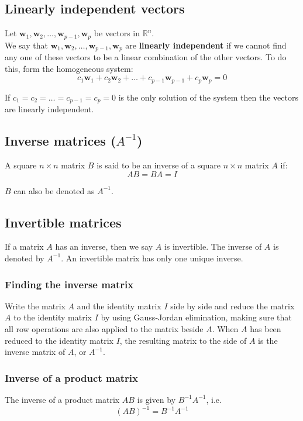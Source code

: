 \documentclass[11pt]{article}
\begin{document}
\subsection{Linearly independent vectors}
\label{sec:org09f90ef}
Let \(\boldsymbol{w}_1, \boldsymbol{w}_2, \ldots, \boldsymbol{w}_{p-1}, \boldsymbol{w}_p\) be vectors in \(\mathbb{R}^n\).
\\[0pt]

We say that \(\boldsymbol{w}_1, \boldsymbol{w}_2, \ldots, \boldsymbol{w}_{p-1}, \boldsymbol{w}_p\) are \textbf{linearly independent} if we cannot find any one of these vectors to be a linear combination of the other vectors. To do this, form the homogeneous system:
\[c_1 \boldsymbol{w}_1 + c_2 \boldsymbol{w}_2 + \ldots + c_{p-1} \boldsymbol{w}_{p-1} + c_p \boldsymbol{w}_p = 0\]

If \(c_1 = c_2 = \ldots = c_{p-1} = c_p = 0\) is the only solution of the system then the vectors are linearly independent.

\subsection{Inverse matrices (\(A^{-1}\))}
\label{sec:orgd551f43}
A square \(n \times n\) matrix \(B\) is said to be an inverse of a square \(n \times n\) matrix \(A\) if:
\[AB = BA = I\]

\(B\) can also be denoted as \(A^{-1}\).

\subsection{Invertible matrices}
\label{sec:org859c2bd}
If a matrix \(A\) has an inverse, then we say \(A\) is invertible. The inverse of \(A\) is denoted by \(A^{-1}\). An invertible matrix has only one unique inverse.

\subsubsection{Finding the inverse matrix}
\label{sec:org065c8a9}
Write the matrix \(A\) and the identity matrix \(I\) side by side and reduce the matrix \(A\) to the identity matrix \(I\) by using Gauss-Jordan elimination, making sure that all row operations are also applied to the matrix beside \(A\). When \(A\) has been reduced to the identity matrix \(I\), the resulting matrix to the side of \(A\) is the inverse matrix of \(A\), or \(A^{-1}\).

\subsubsection{Inverse of a product matrix}
\label{sec:org2adb221}
The inverse of a product matrix \(AB\) is given by \(B^{-1} A^{-1}\), i.e.
\[(AB)^{-1} = B^{-1} A^{-1}\]
\end{document}
